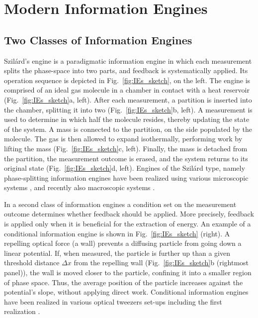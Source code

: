 \documentclass[aps, twocolumn,floatfix,showpacs, superscriptaddress]{revtex4-2}
\newcommand{\ie}{information engines }
\newcommand{\IE}{Information Engines }
\begin{document}
\section{Modern \IE}
\label{Sec:Experimental}

\subsection{Two Classes of Information Engines}

Szil\'ard's engine is a paradigmatic information engine in which each measurement splits the phase-space into two parts, and feedback is systematically applied. Its operation sequence is depicted in Fig.~\ref{fig:IEs_sketch}, on the left. The engine is comprised of an ideal gas molecule in a chamber in contact with a heat reservoir (Fig.~\ref{fig:IEs_sketch}a, left). After each measurement, a partition is inserted into the chamber, splitting it into two (Fig.~\ref{fig:IEs_sketch}b, left). A measurement is used to determine in which half the molecule resides, thereby updating the state of the system. A mass is connected to the partition, on the side populated by the molecule. The gas is then allowed to expand isothermally, performing work by lifting the mass (Fig.~\ref{fig:IEs_sketch}c, left). Finally, the mass is detached from the partition, the measurement outcome is erased, and the system returns to its original state (Fig.~\ref{fig:IEs_sketch}d, left).
Engines of the Szil\'ard type, namely phase-splitting \ie have been realized using various microscopic systems \cite{koski_experimental_2014, roldan_universal_2014, Ribezzi_Crivellari_2019}, and recently also macroscopic systems \cite{Chor2023}.

In a second class of \ie a condition set on the measurement outcome determines whether feedback should be applied.
More precisely, feedback is applied only when it is beneficial for the extraction of energy.
An example of a conditional information engine is shown in Fig.~\ref{fig:IEs_sketch} (right). A repelling optical force (a wall) prevents a diffusing particle from going down a linear potential. If, when measured, the particle is further up than a given threshold distance $\Delta x$ from the repelling wall (Fig.~\ref{fig:IEs_sketch}b (rightmost panel)), the wall is moved closer to the particle, confining it into a smaller region of phase space. Thus, the average position of the particle increases against the potential's slope, without applying direct work. Conditional \ie have been realized in various optical tweezers set-ups \cite{admon_experimental_2018, paneru_lossless_2018, lee_experimentally-achieved_2018, saha2021maximizing, saha2023information} including the first realization \cite{toyabe_experimental_2010}.
\end{document}
